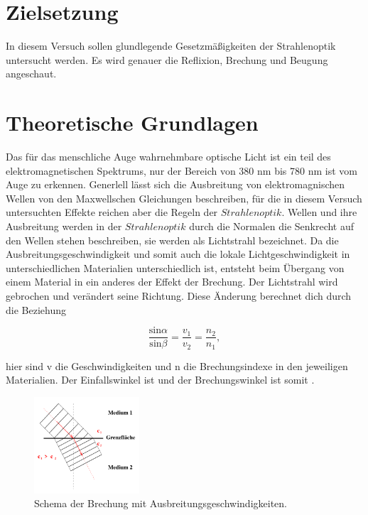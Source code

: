 \section{Zielsetzung}

    \noindent In diesem Versuch sollen glundlegende Gesetzmäßigkeiten der Strahlenoptik untersucht werden.
    Es wird genauer die Reflixion, Brechung und Beugung angeschaut.

\section{Theoretische Grundlagen}

    Das für das menschliche Auge wahrnehmbare optische Licht ist ein teil des elektromagnetischen Spektrums, nur der Bereich von 380 nm bis 780 
    nm ist vom Auge zu erkennen. Generlell lässt sich die Ausbreitung von elektromagnischen Wellen von den Maxwellschen Gleichungen beschreiben, 
    für die in diesem Versuch untersuchten Effekte reichen aber die Regeln der $Strahlenoptik$. Wellen und ihre Ausbreitung werden in der 
    $Strahlenoptik$ durch die Normalen die Senkrecht auf den Wellen stehen beschreiben, sie werden als Lichtstrahl bezeichnet. Da die 
    Ausbreitungsgeschwindigkeit und somit auch die lokale Lichtgeschwindigkeit in unterschiedlichen Materialien unterschiedlich ist, entsteht beim 
    Übergang von einem Material in ein anderes der Effekt der Brechung. Der Lichtstrahl wird gebrochen und verändert seine Richtung. 
    Diese Änderung berechnet dich durch die Beziehung

    \begin{equation}
        \frac{\text{sin}\alpha}{\text{sin} \beta} = \frac{v_1}{v_2} = \frac{n_2}{n_1},
    \end{equation}

    \noindent   hier sind v die Geschwindigkeiten und n die Brechungsindexe in den jeweiligen Materialien. Der Einfallswinkel ist \alpha und der 
    Brechungswinkel ist somit \beta.

    \begin{figure}[H]
        \centering
        \includegraphics[width=0.35\textwidth]{latex/images/T1.PNG}
        \caption{Schema der Brechung mit Ausbreitungsgeschwindigkeiten\protect \cite{V400}.}
    \end{figure}

